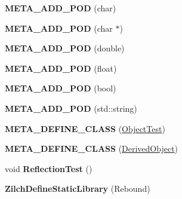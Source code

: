 \begin{DoxyCompactItemize}
\item 
\hypertarget{namespaceDCEngine_a351a64e6550354c9fa8107e2c2ab32ae}{{\bfseries M\-E\-T\-A\-\_\-\-A\-D\-D\-\_\-\-P\-O\-D} (char)}\label{namespaceDCEngine_a351a64e6550354c9fa8107e2c2ab32ae}

\item 
\hypertarget{namespaceDCEngine_a5f2904731b4806e0c10dbd88d026ce66}{{\bfseries M\-E\-T\-A\-\_\-\-A\-D\-D\-\_\-\-P\-O\-D} (char $\ast$)}\label{namespaceDCEngine_a5f2904731b4806e0c10dbd88d026ce66}

\item 
\hypertarget{namespaceDCEngine_a2251554a74b1f590e5717bedb8be2e4c}{{\bfseries M\-E\-T\-A\-\_\-\-A\-D\-D\-\_\-\-P\-O\-D} (double)}\label{namespaceDCEngine_a2251554a74b1f590e5717bedb8be2e4c}

\item 
\hypertarget{namespaceDCEngine_a5fc7c41b8096f9c5d5cfcc12afb04256}{{\bfseries M\-E\-T\-A\-\_\-\-A\-D\-D\-\_\-\-P\-O\-D} (float)}\label{namespaceDCEngine_a5fc7c41b8096f9c5d5cfcc12afb04256}

\item 
\hypertarget{namespaceDCEngine_acd9c84c4c765e9f99f1e49abbc1b40ef}{{\bfseries M\-E\-T\-A\-\_\-\-A\-D\-D\-\_\-\-P\-O\-D} (bool)}\label{namespaceDCEngine_acd9c84c4c765e9f99f1e49abbc1b40ef}

\item 
\hypertarget{namespaceDCEngine_a77824fffc46f8d90be94e69341ae0266}{{\bfseries M\-E\-T\-A\-\_\-\-A\-D\-D\-\_\-\-P\-O\-D} (std\-::string)}\label{namespaceDCEngine_a77824fffc46f8d90be94e69341ae0266}

\item 
\hypertarget{namespaceDCEngine_adf1b727570613062227359752ae4e223}{{\bfseries M\-E\-T\-A\-\_\-\-D\-E\-F\-I\-N\-E\-\_\-\-C\-L\-A\-S\-S} (\hyperlink{classDCEngine_1_1ObjectTest}{Object\-Test})}\label{namespaceDCEngine_adf1b727570613062227359752ae4e223}

\item 
\hypertarget{namespaceDCEngine_aefc725662c8816ab11e01cbf0635675f}{{\bfseries M\-E\-T\-A\-\_\-\-D\-E\-F\-I\-N\-E\-\_\-\-C\-L\-A\-S\-S} (\hyperlink{classDCEngine_1_1DerivedObject}{Derived\-Object})}\label{namespaceDCEngine_aefc725662c8816ab11e01cbf0635675f}

\item 
\hypertarget{namespaceDCEngine_ade38d4cb5707b2e7c3063dc64d07013b}{void {\bfseries Reflection\-Test} ()}\label{namespaceDCEngine_ade38d4cb5707b2e7c3063dc64d07013b}

\item 
\hypertarget{namespaceDCEngine_a944d41d010a3540210bfd75fcdbdcdac}{{\bfseries Zilch\-Define\-Static\-Library} (Rebound)}\label{namespaceDCEngine_a944d41d010a3540210bfd75fcdbdcdac}


\end{DoxyCompactItemize}
